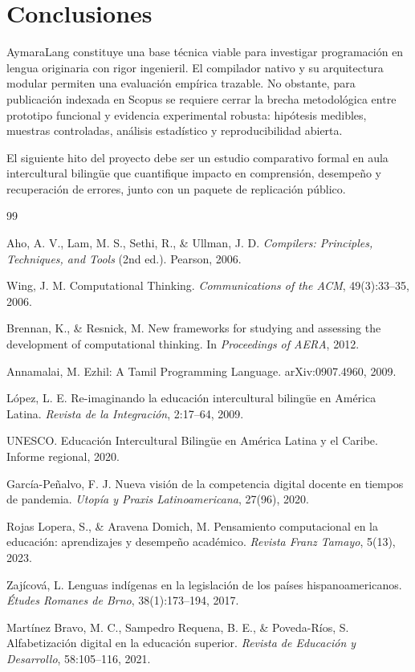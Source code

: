 \documentclass[11pt,a4paper]{article}
\begin{document}
\section{Conclusiones}
AymaraLang constituye una base t\'ecnica viable para investigar programaci\'on en lengua originaria con rigor ingenieril. El compilador nativo y su arquitectura modular permiten una evaluaci\'on emp\'irica trazable. No obstante, para publicaci\'on indexada en Scopus se requiere cerrar la brecha metodol\'ogica entre prototipo funcional y evidencia experimental robusta: hip\'otesis medibles, muestras controladas, an\'alisis estad\'istico y reproducibilidad abierta.

El siguiente hito del proyecto debe ser un estudio comparativo formal en aula intercultural biling\"ue que cuantifique impacto en comprensi\'on, desempe\~no y recuperaci\'on de errores, junto con un paquete de replicaci\'on p\'ublico.

\begin{thebibliography}{99}

Aho, A. V., Lam, M. S., Sethi, R., \& Ullman, J. D.
\newblock \emph{Compilers: Principles, Techniques, and Tools} (2nd ed.).
\newblock Pearson, 2006.

Wing, J. M.
\newblock Computational Thinking.
\newblock \emph{Communications of the ACM}, 49(3):33--35, 2006.

Brennan, K., \& Resnick, M.
\newblock New frameworks for studying and assessing the development of computational thinking.
\newblock In \emph{Proceedings of AERA}, 2012.

Annamalai, M.
\newblock Ezhil: A Tamil Programming Language.
\newblock arXiv:0907.4960, 2009.

L\'opez, L. E.
\newblock Re-imaginando la educaci\'on intercultural biling\"ue en Am\'erica Latina.
\newblock \emph{Revista de la Integraci\'on}, 2:17--64, 2009.

UNESCO.
\newblock Educaci\'on Intercultural Biling\"ue en Am\'erica Latina y el Caribe.
\newblock Informe regional, 2020.

Garc\'ia-Pe\~nalvo, F. J.
\newblock Nueva visi\'on de la competencia digital docente en tiempos de pandemia.
\newblock \emph{Utop\'ia y Praxis Latinoamericana}, 27(96), 2020.

Rojas Lopera, S., \& Aravena Domich, M.
\newblock Pensamiento computacional en la educaci\'on: aprendizajes y desempe\~no acad\'emico.
\newblock \emph{Revista Franz Tamayo}, 5(13), 2023.

Zaj\'icov\'a, L.
\newblock Lenguas ind\'igenas en la legislaci\'on de los pa\'ises hispanoamericanos.
\newblock \emph{\'Etudes Romanes de Brno}, 38(1):173--194, 2017.

Mart\'inez Bravo, M. C., Sampedro Requena, B. E., \& Poveda-R\'ios, S.
\newblock Alfabetizaci\'on digital en la educaci\'on superior.
\newblock \emph{Revista de Educaci\'on y Desarrollo}, 58:105--116, 2021.

\end{thebibliography}
\end{document}
